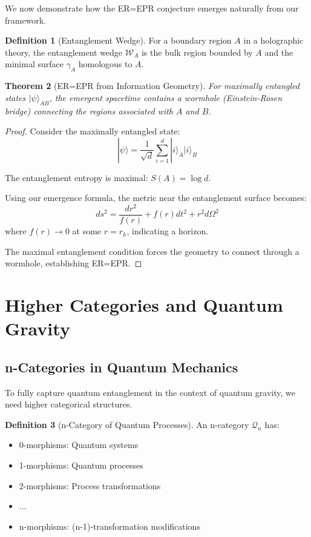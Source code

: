 \documentclass[12pt,a4paper]{article}
\theoremstyle{plain}
\newtheorem{theorem}{Theorem}[section]
\theoremstyle{definition}
\newtheorem{definition}[theorem]{Definition}
\theoremstyle{remark}
\begin{document}
We now demonstrate how the ER=EPR conjecture emerges naturally from our framework.

\begin{definition}[Entanglement Wedge]
For a boundary region $A$ in a holographic theory, the entanglement wedge $\mathcal{W}_A$ is the bulk region bounded by $A$ and the minimal surface $\gamma_A$ homologous to $A$.
\end{definition}

\begin{theorem}[ER=EPR from Information Geometry]
For maximally entangled states $|\psi\rangle_{AB}$, the emergent spacetime contains a wormhole (Einstein-Rosen bridge) connecting the regions associated with $A$ and $B$.
\end{theorem}

\begin{proof}
Consider the maximally entangled state:
\[|\psi\rangle = \frac{1}{\sqrt{d}}\sum_{i=1}^d |i\rangle_A |i\rangle_B\]

The entanglement entropy is maximal: $S(A) = \log d$.

Using our emergence formula, the metric near the entanglement surface becomes:
\[ds^2 = \frac{dr^2}{f(r)} + f(r)dt^2 + r^2 d\Omega^2\]
where $f(r) \to 0$ at some $r = r_h$, indicating a horizon.

The maximal entanglement condition forces the geometry to connect through a wormhole, establishing ER=EPR.
\end{proof}

\section{Higher Categories and Quantum Gravity}

\subsection{n-Categories in Quantum Mechanics}

To fully capture quantum entanglement in the context of quantum gravity, we need higher categorical structures.

\begin{definition}[n-Category of Quantum Processes]
An n-category $\mathcal{Q}_n$ has:
\begin{itemize}
\item 0-morphisms: Quantum systems
\item 1-morphisms: Quantum processes
\item 2-morphisms: Process transformations
\item ...
\item n-morphisms: (n-1)-transformation modifications
\end{itemize}
\end{definition}
\end{document}
